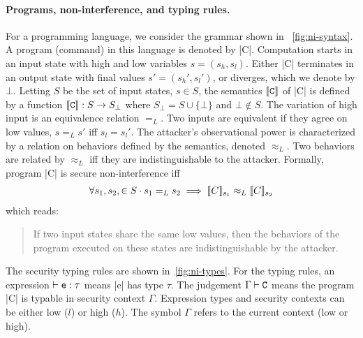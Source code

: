 \paragraph*{Programs, non-interference, and typing rules.}
For a programming language, we consider the grammar shown in ~\autoref{fig:ni-syntax}.
A program (command) in this language is denoted by \pr|C|.
Computation starts in an input state with high and low variables \(s = (s_h, s_l)\).
Either \pr|C| terminates in an output state with final values \(s' = (s_h', s_l')\), or diverges, which we denote by \(\bot\).
Letting \(S\) be the set of input states, \(s \in S \),
the semantics \(\sem{\text{\pr|C|}}\) of \pr|C| is defined by a function \(\sem{\text{\pr|C|}} : S \rightarrow S_\bot \) where \( S_\bot = S \cup \{ \bot \} \) and \( \bot \notin S\).
The variation of high input is an equivalence relation \(=_L\).
Two inputs are equivalent if they agree on low values, \ie \(s =_L s'\) iff \( s_l = s_l' \).
The attacker's observational power is characterized by a relation on behaviors defined by the semantics, denoted \(\approx_L\).
Two behaviors are related by \(\approx_L\) iff they are indistinguishable to the attacker.
Formally, program \pr|C| is secure \wrt non-interference iff
\begin{align*}
\forall s_1,s_2, \in S \cdot s_1 =_L s_2 \implies \llbracket C\rrbracket_{s_1} \approx_L \llbracket C\rrbracket_{s_2}
\end{align*}
which reads:
\begin{quotation}
\noindent If two input states share the same low values, then the behaviors of the program executed on these states are indistinguishable by the attacker.
\end{quotation}
The security typing rules are shown in~\autoref{fig:ni-types}.
For the typing rules, an expression \(\vdash\prm{e} : \tau\) means \pr|e| has type \(\tau\).
The judgement \(\Gamma\vdash\text{\pr|C|}\) means the program \pr|C| is typable in security context \({\Gamma}\).
Expression types and security contexts can be either low (\({l}\)) or high (\({h}\)).
The symbol \(\Gamma\) refers to the current context (low or high).

